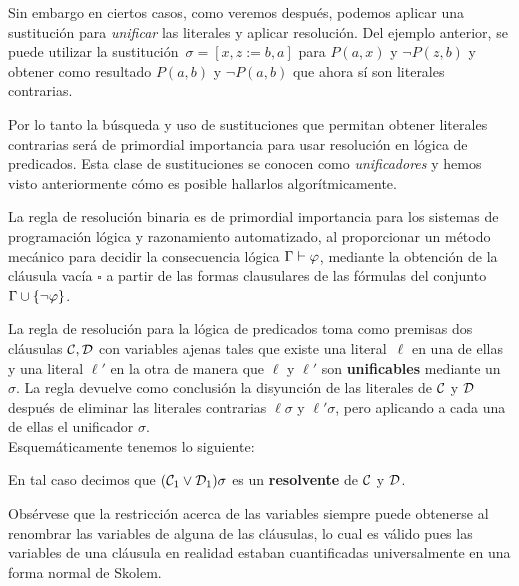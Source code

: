 \documentclass[11pt,letterpaper]{article}
\begin{document}
Sin embargo en ciertos casos, como veremos después, podemos aplicar una
sustitución para \textit{unificar} las literales y aplicar resoluci\'on.
Del ejemplo anterior, se puede utilizar la sustitución~$\sigma=[x,z:=b,a]$ para
$ P(a,x)$ y $\neg P(z,b)$ y obtener como resultado $P(a,b)$ y $\neg P(a,b)$ 
que ahora sí son literales contrarias. 


Por lo tanto la búsqueda y uso de sustituciones que permitan obtener literales 
contrarias será de primordial importancia para usar resolución en lógica de 
predicados. Esta clase de sustituciones se conocen como \textit{unificadores} y 
hemos visto anteriormente c\'omo es posible hallarlos algorítmicamente.

\medskip

La regla de resolución binaria es de primordial importancia para los sistemas
de programación lógica y razonamiento automatizado, al proporcionar un método
mecánico para decidir la consecuencia lógica $\G\vdash \vp$, mediante la
obtención de la cláusula vacía $\square$ a partir 
de las formas clausulares de las fórmulas del conjunto $\G\cup\{\lnot\vp\}$.

\bigskip

La regla de resolución para la lógica de predicados toma como
premisas dos cláusulas $\C,\De$ con variables ajenas tales que existe una
literal~$\ell$ en una de ellas y una literal $\ell'$ en la otra de manera que 
$\ell$ y $\ell'$ son \textbf{unificables} mediante un $\sigma$. 
La regla devuelve como conclusión la disyunción de las literales de $\C$ y $\De$ 
después de eliminar las literales contrarias $\ell\sigma$ y $\ell'\sigma$, pero 
aplicando a cada una de ellas el unificador $\sigma$. \\
Esquemáticamente tenemos lo siguiente:

\begin{mathpar}
\end{mathpar}
En tal caso decimos que $(\C_1\lor\De_1)\sigma$ es un \textbf{resolvente} de
$\C$ y $\De$.

\noindent Obsérvese que la restricción acerca de las variables siempre puede obtenerse al renombrar las variables de alguna de las cláusulas, lo cual es válido pues las variables de una cláusula en realidad estaban cuantificadas
universalmente en una forma normal de Skolem.


\end{document}
